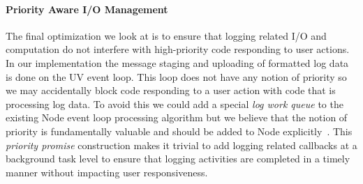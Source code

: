 \paragraph{Priority Aware I/O Management}
\noindent
The final optimization we look at is to ensure 
that logging related I/O and computation do not interfere with high-priority 
code responding to user actions. In our implementation the message staging 
and uploading of formatted log data is done on the UV event loop. This loop does 
not have any notion of priority so we may accidentally block code responding 
to a user action with code that is processing log data. To avoid this we could 
add a special \emph{log work queue} to the existing Node event loop processing 
algorithm but we believe that the notion of priority is 
fundamentally valuable and should be added to Node explicitly~\cite{asynchjs}. 
This \emph{priority promise} construction makes it trivial to add logging related 
callbacks at a background task level to ensure 
that logging activities are completed in a timely manner without impacting user 
responsiveness.






